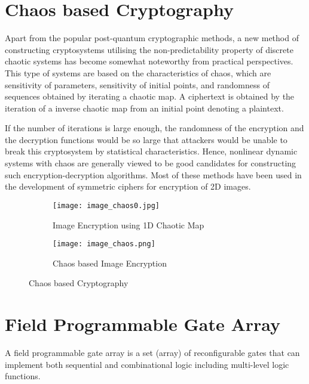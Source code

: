 

\section{Chaos based Cryptography}
Apart from the popular post-quantum cryptographic methods, a new method of constructing cryptosystems utilising the non-predictability property of discrete chaotic systems has become somewhat noteworthy from practical perspectives. This type of systems are based on the characteristics of chaos, which are sensitivity of parameters, sensitivity of initial points, and randomness of sequences obtained by iterating a chaotic map. A ciphertext is obtained by the iteration of a inverse chaotic map from an initial point denoting a plaintext. 

If the number of iterations is large enough, the randomness of the encryption and the decryption functions would be so large that attackers would be unable to break this cryptosystem by statistical characteristics. Hence, nonlinear dynamic systems with chaos are generally viewed to be good candidates for constructing such encryption-decryption algorithms. Most of these methods have been used in the development of symmetric ciphers for encryption of 2D images.

\begin{figure}[H]
\begin{subfigure}{0.5\textwidth}
\texttt{[image: image\_chaos0.jpg]}
\caption{Image Encryption using 1D Chaotic Map}\label{fig:image_chaos0}
\end{subfigure}
\begin{subfigure}{0.5\textwidth}
\texttt{[image: image\_chaos.png]}
\caption{Chaos based Image Encryption}\label{fig:image_chaos}
\end{subfigure}
\caption{Chaos based Cryptography}\label{fig:image0}
\end{figure}

\section{Field Programmable Gate Array}
A field programmable gate array is a set (array) of reconfigurable gates that can implement both sequential and combinational logic including multi-level logic functions.

